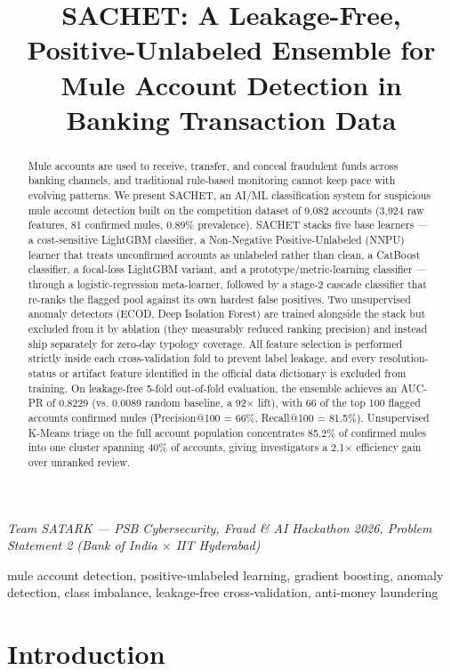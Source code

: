 \documentclass{article}
\title{SACHET: A Leakage-Free, Positive-Unlabeled Ensemble for Mule Account Detection in Banking Transaction Data}
\begin{document}
\maketitle
\begin{center}
\textit{Team SATARK --- PSB Cybersecurity, Fraud \& AI Hackathon 2026, Problem Statement 2 (Bank of India $\times$ IIT Hyderabad)}
\end{center}
%
\begin{abstract}
Mule accounts are used to receive, transfer, and conceal fraudulent funds across banking
channels, and traditional rule-based monitoring cannot keep pace with evolving patterns.
We present SACHET, an AI/ML classification system for suspicious mule account detection
built on the competition dataset of 9{,}082 accounts (3{,}924 raw features, 81 confirmed
mules, 0.89\% prevalence). SACHET stacks five base learners --- a cost-sensitive LightGBM
classifier, a Non-Negative Positive-Unlabeled (NNPU) learner that treats unconfirmed
accounts as unlabeled rather than clean, a CatBoost classifier, a focal-loss LightGBM
variant, and a prototype/metric-learning classifier --- through a logistic-regression
meta-learner, followed by a stage-2 cascade classifier that re-ranks the flagged pool
against its own hardest false positives. Two unsupervised anomaly detectors (ECOD, Deep
Isolation Forest) are trained alongside the stack but excluded from it by ablation (they
measurably reduced ranking precision) and instead ship separately for zero-day typology
coverage. All feature selection is performed strictly inside each cross-validation fold
to prevent label leakage, and every resolution-status or artifact feature identified in
the official data dictionary is excluded from training. On leakage-free 5-fold
out-of-fold evaluation, the ensemble achieves an AUC-PR of 0.8229 (vs. 0.0089 random
baseline, a 92$\times$ lift), with 66 of the top 100 flagged accounts confirmed mules
(Precision@100 = 66\%, Recall@100 = 81.5\%). Unsupervised K-Means triage on the full
account population concentrates 85.2\% of confirmed mules into one cluster spanning 40\%
of accounts, giving investigators a 2.1$\times$ efficiency gain over unranked review.
\end{abstract}
%
\begin{keywords}
mule account detection, positive-unlabeled learning, gradient boosting, anomaly detection,
class imbalance, leakage-free cross-validation, anti-money laundering
\end{keywords}
%
\section{Introduction}
\label{sec:intro}
\end{document}
